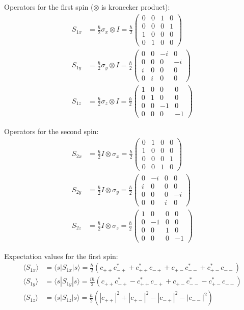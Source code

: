 Operators for the first spin ($\otimes$ is kronecker product):
\begin{align*}
S_{1x}&=\frac{\hbar}{2}\sigma_x\otimes I=\frac{\hbar}{2}
\begin{pmatrix}
0&0&1&0\\
0&0&0&1\\
1&0&0&0\\
0&1&0&0
\end{pmatrix}
\\
S_{1y}&=\frac{\hbar}{2}\sigma_y\otimes I=\frac{\hbar}{2}
\begin{pmatrix}
0&0&-i&0\\
0&0&0&-i\\
i&0&0&0\\
0&i&0&0
\end{pmatrix}
\\
S_{1z}&=\frac{\hbar}{2}\sigma_z\otimes I=\frac{\hbar}{2}
\begin{pmatrix}
1&0&0&0\\
0&1&0&0\\
0&0&-1&0\\
0&0&0&-1
\end{pmatrix}
\end{align*}

Operators for the second spin:
\begin{align*}
S_{2x}&=\frac{\hbar}{2}I\otimes\sigma_x=\frac{\hbar}{2}
\begin{pmatrix}
0&1&0&0\\
1&0&0&0\\
0&0&0&1\\
0&0&1&0
\end{pmatrix}
\\
S_{2y}&=\frac{\hbar}{2}I\otimes\sigma_y=\frac{\hbar}{2}
\begin{pmatrix}
0&-i&0&0\\
i&0&0&0\\
0&0&0&-i\\
0&0&i&0
\end{pmatrix}
\\
S_{2z}&=\frac{\hbar}{2}I\otimes\sigma_z=\frac{\hbar}{2}
\begin{pmatrix}
1&0&0&0\\
0&-1&0&0\\
0&0&1&0\\
0&0&0&-1
\end{pmatrix}
\end{align*}

Expectation values for the first spin:
\begin{align*}
\langle S_{1x}\rangle&=\langle s|S_{1x}|s\rangle
=\frac{\hbar}{2}
\left(c_{++}c_{-+}^*+c_{++}^*c_{-+}+c_{+-}c_{--}^*+c_{+-}^*c_{--}\right)
\\
\langle S_{1y}\rangle&=\langle s|S_{1y}|s\rangle
=\frac{i\hbar}{2}
\left(c_{++}c_{-+}^*-c_{++}^*c_{-+}+c_{+-}c_{--}^*-c_{+-}^*c_{--}\right)
\\
\langle S_{1z}\rangle&=\langle s|S_{1z}|s\rangle
=\frac{\hbar}{2}
\left(|c_{++}|^2+|c_{+-}|^2-|c_{-+}|^2-|c_{--}|^2\right)
\end{align*}

